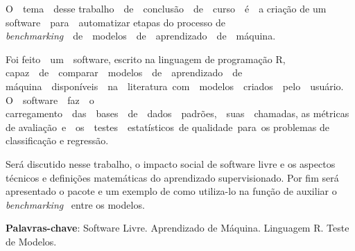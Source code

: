


\begin{resumo}

O  tema  desse trabalho  de  conclusão  de  curso  é  a criação de um software  para  automatizar etapas do processo de \textit{benchmarking}  de  modelos  de  aprendizado  de  máquina. 

Foi feito  um  software, escrito na linguagem de programação R, capaz  de  comparar  modelos  de  aprendizado  de máquina  disponíveis  na  literatura com  modelos  criados  pelo  usuário.  O  software  faz  o carregamento  das  bases  de  dados  padrões,  suas  chamadas, as métricas de avaliação e  os  testes  estatísticos de qualidade para os problemas de classificação e regressão.

Será discutido nesse trabalho, o impacto social de software livre e os aspectos técnicos e definições matemáticas do aprendizado supervisionado. Por fim será apresentado o pacote e um exemplo de como utiliza-lo na função de auxiliar o  \textit{benchmarking}  entre os modelos.
 
\textbf{Palavras-chave}: Software Livre. Aprendizado de Máquina. Linguagem R. Teste de Modelos.

 

\end{resumo}



